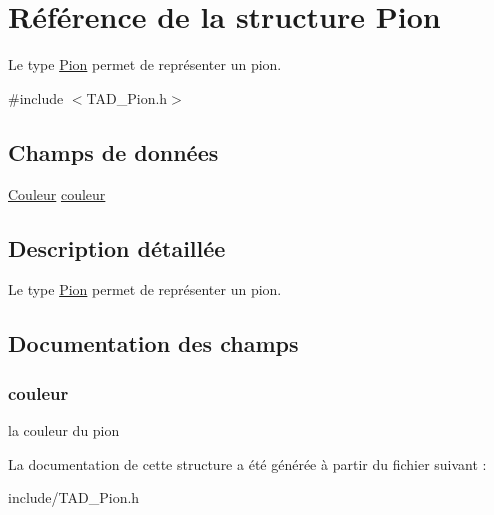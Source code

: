 \hypertarget{struct_pion}{\section{Référence de la structure Pion}
\label{struct_pion}
}


Le type \hyperlink{struct_pion}{Pion} permet de représenter un pion.  




{\ttfamily \#include $<$T\-A\-D\-\_\-\-Pion.\-h$>$}

\subsection*{Champs de données}
\begin{DoxyCompactItemize}
\item 
\hyperlink{_t_a_d___couleur_8h_aa304d0ca681f782b1d7735da33037dd7}{Couleur} \hyperlink{struct_pion_af0e152d09c13944935e00bef7a3c5111}{couleur}
\end{DoxyCompactItemize}


\subsection{Description détaillée}
Le type \hyperlink{struct_pion}{Pion} permet de représenter un pion. 

\subsection{Documentation des champs}
\hypertarget{struct_pion_af0e152d09c13944935e00bef7a3c5111}{
\subsubsection[{couleur}]{ couleur}}\label{struct_pion_af0e152d09c13944935e00bef7a3c5111}
la couleur du pion 

La documentation de cette structure a été générée à partir du fichier suivant \-:\begin{DoxyCompactItemize}
\item 
include/T\-A\-D\-\_\-\-Pion.\-h\end{DoxyCompactItemize}
